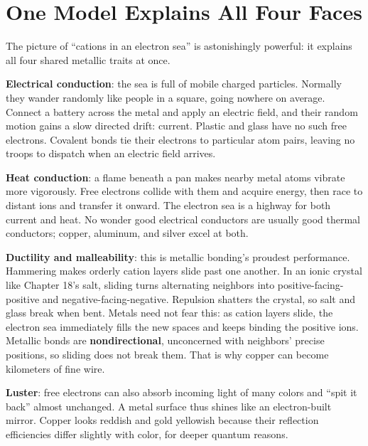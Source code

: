 \section{One Model Explains All Four Faces}

The picture of ``cations in an electron sea'' is astonishingly powerful: it explains all four shared metallic traits at once.

\textbf{Electrical conduction}: the sea is full of mobile charged particles. Normally they wander randomly like people in a square, going nowhere on average. Connect a battery across the metal and apply an electric field, and their random motion gains a slow directed drift: current. Plastic and glass have no such free electrons. Covalent bonds tie their electrons to particular atom pairs, leaving no troops to dispatch when an electric field arrives.

\textbf{Heat conduction}: a flame beneath a pan makes nearby metal atoms vibrate more vigorously. Free electrons collide with them and acquire energy, then race to distant ions and transfer it onward. The electron sea is a highway for both current and heat. No wonder good electrical conductors are usually good thermal conductors; copper, aluminum, and silver excel at both.

\textbf{Ductility and malleability}: this is metallic bonding's proudest performance. Hammering makes orderly cation layers slide past one another. In an ionic crystal like Chapter 18's salt, sliding turns alternating neighbors into positive-facing-positive and negative-facing-negative. Repulsion shatters the crystal, so salt and glass break when bent. Metals need not fear this: as cation layers slide, the electron sea immediately fills the new spaces and keeps binding the positive ions. Metallic bonds are \textbf{nondirectional}, unconcerned with neighbors' precise positions, so sliding does not break them. That is why copper can become kilometers of fine wire.

\textbf{Luster}: free electrons can also absorb incoming light of many colors and ``spit it back'' almost unchanged. A metal surface thus shines like an electron-built mirror. Copper looks reddish and gold yellowish because their reflection efficiencies differ slightly with color, for deeper quantum reasons.

